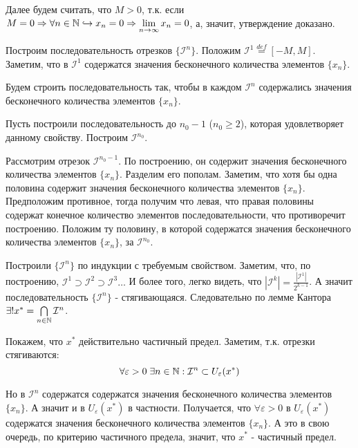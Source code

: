 Далее будем считать, что $M > 0$, т.к. если $M = 0 \Rightarrow \forall n \in \mathbb{N} \hookrightarrow x_n = 0 \Rightarrow \lim\limits_{n \to \infty} x_n = 0$, а, значит, утверждение доказано.

Построим последовательность отрезков $\{\mathcal{I}^n\}$. Положим $\mathcal{I}^1 \overset{def}{=} [-M, M]$. Заметим, что в $\mathcal{I}^1$ содержатся значения бесконечного количества элементов $\{x_n\}$.

Будем строить последовательность так, чтобы в каждом $\mathcal{I}^n$ содержались значения бесконечного количества элементов $\{x_n\}$. 

Пусть построили последовательность до $n_0 - 1$ ($n_0 \geq 2$), которая удовлетворяет данному свойству. Построим $\mathcal{I}^{n_0}$.

Рассмотрим отрезок $\mathcal{I}^{n_0 - 1}$. По построению, он содержит значения бесконечного количества элементов $\{x_n\}$. Разделим его пополам. 
Заметим, что хотя бы одна половина содержит значения бесконечного количества элементов $\{x_n\}$.
Предположим противное, тогда получим что левая, что правая половины содержат конечное количество элементов последовательности, что противоречит построению.
Положим ту половину, в которой содержатся значения бесконечного количества элементов $\{x_n\}$, за $\mathcal{I}^{n_0}$.

Построили $\{\mathcal{I}^n\}$ по индукции с требуемым свойством. Заметим, что, по построению, $\mathcal{I}^1 \supset \mathcal{I}^2 \supset \mathcal{I}^3 \dots$
И более того, легко видеть, что $|\mathcal{I}^k| = \frac{|\mathcal{I}^1|}{2^{k - 1}}$. А значит последовательность $\{\mathcal{I}^n\}$ - стягивающаяся. 
Следовательно по лемме Кантора $\exists! x^* = \bigcap\limits_{n \in \mathbb{N}} \mathcal{I}^n$.

Покажем, что $x^*$ действительно частичный предел. Заметим, т.к. отрезки стягиваются:
\begin{equation*}
    \forall \varepsilon > 0 \; \exists n \in \mathbb{N}: \mathcal{I}^n \subset U_\varepsilon(x^*)
\end{equation*}

Но в $\mathcal{I}^n$ содержатся содержатся значения бесконечного количества элементов $\{x_n\}$. А значит и в $U_\varepsilon(x^*)$ в частности. Получается, что $\forall \varepsilon > 0$ в $U_\varepsilon(x^*)$ содержатся значения бесконечного количества элементов $\{x_n\}$.
А это в свою очередь, по критерию частичного предела, значит, что $x^*$ - частичный предел.

\Endproof

